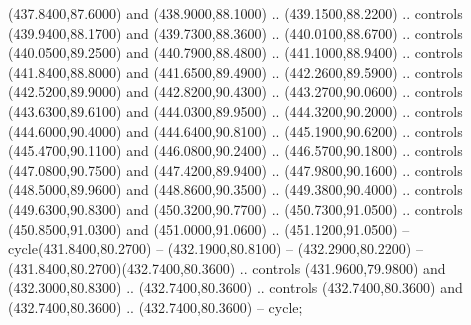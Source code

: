 {\begin{scope}[y=0.80pt, x=0.80pt, yscale=-1, xscale=1, inner sep=0pt, outer sep=0pt, #1]
      (437.8400,87.6000) and (438.9000,88.1000) .. (439.1500,88.2200) .. controls
      (439.9400,88.1700) and (439.7300,88.3600) .. (440.0100,88.6700) .. controls
      (440.0500,89.2500) and (440.7900,88.4800) .. (441.1000,88.9400) .. controls
      (441.8400,88.8000) and (441.6500,89.4900) .. (442.2600,89.5900) .. controls
      (442.5200,89.9000) and (442.8200,90.4300) .. (443.2700,90.0600) .. controls
      (443.6300,89.6100) and (444.0300,89.9500) .. (444.3200,90.2000) .. controls
      (444.6000,90.4000) and (444.6400,90.8100) .. (445.1900,90.6200) .. controls
      (445.4700,90.1100) and (446.0800,90.2400) .. (446.5700,90.1800) .. controls
      (447.0800,90.7500) and (447.4200,89.9400) .. (447.9800,90.1600) .. controls
      (448.5000,89.9600) and (448.8600,90.3500) .. (449.3800,90.4000) .. controls
      (449.6300,90.8300) and (450.3200,90.7700) .. (450.7300,91.0500) .. controls
      (450.8500,91.0300) and (451.0000,91.0600) .. (451.1200,91.0500) --
      cycle(431.8400,80.2700) -- (432.1900,80.8100) -- (432.2900,80.2200) --
      (431.8400,80.2700)(432.7400,80.3600) .. controls (431.9600,79.9800) and
      (432.3000,80.8300) .. (432.7400,80.3600) .. controls (432.7400,80.3600) and
      (432.7400,80.3600) .. (432.7400,80.3600) -- cycle;


\end{scope}}
